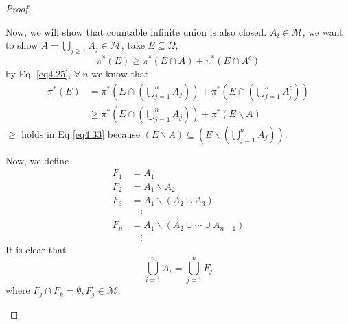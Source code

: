 \begin{proof}
\begin{enumerate}
\begin{enumerate}
			Now, we will show that countable infinite union is also closed. ${A_i} \in \mathcal{M}$, we want to show $A = \bigcup\limits_{j \geqslant 1} {{A_j}}  \in \mathcal{M}$, take $E \subseteq \Omega $,
			\begin{equation}
			{\pi ^*}\left( E \right) \geqslant {\pi ^*}\left( {E \cap A} \right) + {\pi ^*}\left( {E \cap {A^c}} \right)
			\label{eq4.32}
			\end{equation}
			by Eq. \ref{eq4.25}, $ \forall \ n $ we know that
			\begin{equation}
			\begin{split}
			{\pi ^*}\left( E \right) & = {\pi ^*}\left( {E \cap \left( {\bigcup\limits_{j = 1}^n {{A_j}} } \right)} \right) + {\pi ^*}\left( {E \cap \left( {\bigcup\limits_{j = 1}^n {A_{_j}^c} } \right)} \right)\\
			& \ge {\pi ^*}\left( {E \cap \left( {\bigcup\limits_{j = 1}^n {{A_j}} } \right)} \right) + {\pi ^*}\left( {E\backslash A} \right)
			\end{split}
			\label{eq4.33}
			\end{equation}
			$ \ge $ holds in Eq \ref{eq4.33} because $\left( {E\backslash A} \right) \subseteq \left( {E\backslash \left( {\bigcup\limits_{j = 1}^n {{A_j}} } \right)} \right)$.
			
			Now, we define
			\begin{equation}
			\begin{split}
			{F_1} & = {A_1}\\
			{F_2} & = {A_1}\backslash {A_2}\\
			{F_3} & = {A_1}\backslash \left( {{A_2} \cup {A_3}} \right)\\
			      & \quad \vdots \\
			{F_n} & = {A_1}\backslash \left( {{A_2} \cup  \cdots  \cup {A_{n - 1}}} \right)\\
				  & \quad  \vdots 
			\end{split}
			\label{eq4.34}
			\end{equation}
			It is clear that
			\begin{equation}
			\bigcup\limits_{i = 1}^n {{A_i}}  = \bigcup\limits_{j = 1}^n {{F_j}} 
			\label{eq4.35}
			\end{equation}
			where ${F_j} \cap {F_k} = \emptyset ,{F_j} \in \mathcal{M}$.
			

\end{enumerate}
\end{enumerate}
\end{proof}
